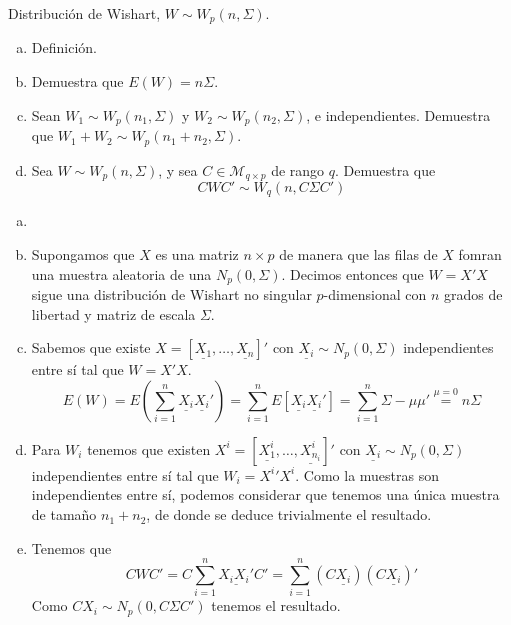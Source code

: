 \documentclass[twoside]{article}
\newcommand{\muestra}[1]{{\underline{#1}}}
\begin{document}
\begin{ejercicio}{1.3}
Distribución de Wishart, $W \sim W_p(n,Σ)$.
\begin{enumerate}[(a)]
\item Definición.
\item Demuestra que $E(W) = nΣ$.
\item Sean $W_1 \sim W_p(n_1,Σ)$ y $W_2 \sim W_p(n_2,Σ)$, e independientes. Demuestra que $W_1 + W_2 \sim W_p(n_1+n_2,Σ)$.
\item Sea $W \sim W_p(n,Σ)$, y sea $C \in \mathcal{M}_{q\times p}$ de rango $q$. Demuestra que
\[ C W C' \sim W_q(n, CΣC') \]
\end{enumerate}
\end{ejercicio}
\begin{solucion}
\begin{enumerate}[(a)]
\item[]
\item Supongamos que $X$ es una matriz $n\times p$ de manera que las filas de $X$ fomran una muestra aleatoria de una $N_p(0,\Sigma)$. Decimos entonces que $W=X'X$ sigue una distribución de Wishart no singular $p$-dimensional con $n$ grados de libertad y matriz de escala $\Sigma$.
\item Sabemos que existe $X=[\muestra{X_1},\dotsc,\muestra{X_n}]'$ con $\muestra{X_i}\sim N_p(0,\Sigma)$ independientes entre sí tal que $W=X'X$.
$$
E(W)= E\left(\sum_{i=1}^n \muestra{X_i}\muestra{X_i}'\right) = \sum_{i=1}^n E[\muestra{X_i}\muestra{X_i}'] = \sum_{i=1}^n \Sigma-\mu\mu' \overset{\mu=0}{=} n\Sigma
$$
\item Para $W_i$ tenemos que existen $ X^i=[\muestra{X_1^i},\dotsc,\muestra{X_{n_i}^i}]'$  con $\muestra{X_i}\sim N_p(0,\Sigma)$ independientes entre sí tal que $W_i={X^i}' X^i$. Como la muestras son independientes entre sí, podemos considerar que tenemos una única muestra de tamaño $n_1+n_2$, de donde se deduce trivialmente el resultado.
\item Tenemos que 
$$
CWC' = C\sum_{i=1}^n \muestra{X_i X_i'}C' = \sum_{i=1}^n (C\muestra{X_i}) (C\muestra{X_i})'
$$
Como $CX_i \sim N_p(0,C\Sigma C')$ tenemos el resultado.
\end{enumerate}
\end{solucion}
\newpage
\end{document}
